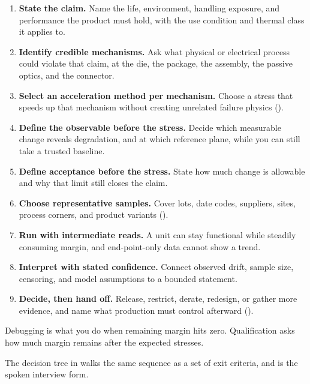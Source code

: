 \begin{enumerate}
\item \textbf{State the claim.} Name the life, environment, handling exposure,
      and performance the product must hold, with the use condition and thermal
      class it applies to.
\item \textbf{Identify credible mechanisms.} Ask what physical or electrical
      process could violate that claim, at the die, the package, the assembly,
      the passive optics, and the connector.
\item \textbf{Select an acceleration method per mechanism.} Choose a stress
      that speeds up that mechanism without creating unrelated failure physics
      ().
\item \textbf{Define the observable before the stress.} Decide which measurable
      change reveals degradation, and at which reference plane, while you can
      still take a trusted baseline.
\item \textbf{Define acceptance before the stress.} State how much change is
      allowable and why that limit still closes the claim.
\item \textbf{Choose representative samples.} Cover lots, date codes,
      suppliers, sites, process corners, and product variants
      ().
\item \textbf{Run with intermediate reads.} A unit can stay functional while
      steadily consuming margin, and end-point-only data cannot show a trend.
\item \textbf{Interpret with stated confidence.} Connect observed drift, sample
      size, censoring, and model assumptions to a bounded statement.
\item \textbf{Decide, then hand off.} Release, restrict, derate, redesign, or
      gather more evidence, and name what production must control afterward
      ().
\end{enumerate}

Debugging is what you do when remaining margin hits zero. Qualification asks
how much margin remains after the expected stresses.


The decision tree in  walks the same sequence as a
set of exit criteria, and  is the spoken interview form.

